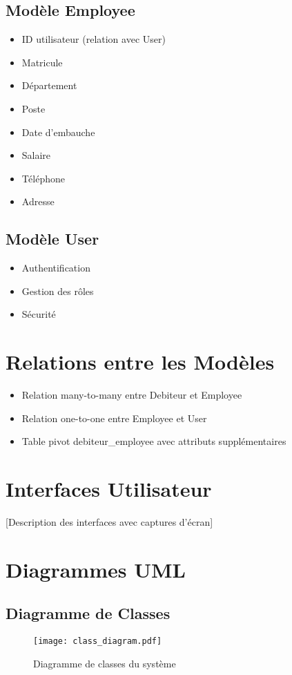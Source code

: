 \documentclass[12pt,a4paper]{report}
\begin{document}
\subsection{Modèle Employee}
\begin{itemize}
    \item ID utilisateur (relation avec User)
    \item Matricule
    \item Département
    \item Poste
    \item Date d'embauche
    \item Salaire
    \item Téléphone
    \item Adresse
\end{itemize}

\subsection{Modèle User}
\begin{itemize}
    \item Authentification
    \item Gestion des rôles
    \item Sécurité
\end{itemize}

\section{Relations entre les Modèles}
\begin{itemize}
    \item Relation many-to-many entre Debiteur et Employee
    \item Relation one-to-one entre Employee et User
    \item Table pivot debiteur\_employee avec attributs supplémentaires
\end{itemize}

\section{Interfaces Utilisateur}
[Description des interfaces avec captures d'écran]

\section{Diagrammes UML}
\subsection{Diagramme de Classes}
\begin{figure}[H]
    \centering
    \texttt{[image: class\_diagram.pdf]}
    \caption{Diagramme de classes du système}
    \label{fig:class_diagram}
\end{figure}
\end{document}
